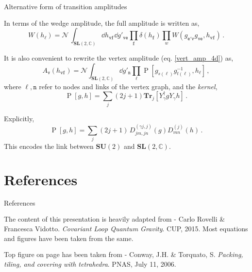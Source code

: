 \documentclass[12pt,titlepage]{article}
\begin{document}
\begin{frame}{Alternative form of transition amplitudes}
    \begin{list}{\,}{\leftmargin=1em \itemindent=0em}
        \item<1-> In terms of the wedge amplitude, the full amplitude is written as,
        \begin{equation}
            W(h_\ell)=\mathcal{N}\,\int_{{\mathbf{SL}(2,\mathbb{C})}}\dd{h_\mathtt{vf}}\dd{g'_\mathtt{ve}}\prod_{\mathtt{f}}\delta(h_\mathtt{f})\prod_w W(g_\mathtt{e'v}g_\mathtt{ve},h_\mathtt{vf})\,.
        \end{equation}
        \item<2-> It is also convenient to rewrite the vertex amplitude (eq. \ref{vert_amp_4d}) as,
        \begin{equation}
            A_\mathtt{v}(h_\mathtt{vf})=\mathcal{N}\int_{{\mathbf{SL}(2,\mathbb{C})}}\dd{g'_\mathtt{n}}\prod_\ell\operatorname{P}[g_{s(\ell)}g^{-1}_{t(\ell)},h_\ell]\,,
        \end{equation}
        where $\ell,\mathtt{n}$ refer to nodes and links of the vertex graph, and the \textit{kernel},
        \begin{equation}
            \operatorname{P}[g,h]=\sum_j(2j+1)\mathbf{Tr}_{j}[Y_\gamma^\dagger g Y_\gamma h]\,.
        \end{equation}
        \item<3-> Explicitly,
        \begin{equation}
            \operatorname{P}[g,h]=\sum_j(2j+1)\,D^{(\gamma j,j)}_{jm,jn}(g) D^{(j)}_{mn}(h)\,.
        \end{equation}
        This encodes the link between $\mathbf{SU}(2)$ and $\mathbf{SL}(2,\mathbb{C})$.
    \end{list}
\end{frame}

\section{References}

\begin{frame}{References}
    \begin{list}{\,}{\leftmargin=1em \itemindent=0em}
        \item<1-> The content of this presentation is heavily adapted from - Carlo Rovelli \& Francesca Vidotto. \emph{Covariant Loop Quantum Gravity}. CUP, 2015. Most equations and figures have been taken from the same.
        \item<2-> Top figure on page \pageref{fig:4.4} has been taken from - Conway, J.H. \& Torquato, S. \emph{Packing, tiling, and covering with tetrahedra}. PNAS, July 11, 2006.
    \end{list}
\end{frame}
\end{document}
